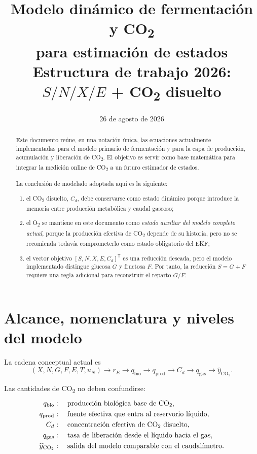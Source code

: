 \documentclass[11pt,a4paper]{article}
\title{\textbf{Modelo dinámico de fermentación y CO\textsubscript{2}\\
para estimación de estados}\\
\large Estructura de trabajo 2026: $S/N/X/E$ + CO\textsubscript{2} disuelto}
\author{}
\date{26 de agosto de 2026}
\newcommand{\COtwo}{\mathrm{CO_2}}
\begin{document}
\maketitle

\begin{abstract}
Este documento reúne, en una notación única, las ecuaciones actualmente implementadas para el
modelo primario de fermentación y para la capa de producción, acumulación y liberación de
CO\textsubscript{2}. El objetivo es servir como base matemática para integrar la medición online
de CO\textsubscript{2} a un futuro estimador de estados.

La conclusión de modelado adoptada aquí es la siguiente:
\begin{enumerate}[label=(\roman*)]
    \item el CO\textsubscript{2} disuelto, $C_d$, debe conservarse como estado dinámico porque
    introduce la memoria entre producción metabólica y caudal gaseoso;
    \item el O\textsubscript{2} se mantiene en este documento como \emph{estado auxiliar del modelo
    completo actual}, porque la producción efectiva de CO\textsubscript{2} depende de su historia,
    pero no se recomienda todavía comprometerlo como estado obligatorio del EKF;
    \item el vector objetivo $[S,N,X,E,C_d]^\mathsf{T}$ es una reducción deseada, pero el modelo
    implementado distingue glucosa $G$ y fructosa $F$. Por tanto, la reducción
    $S=G+F$ requiere una regla adicional para reconstruir el reparto $G/F$.
\end{enumerate}
\end{abstract}

\tableofcontents
\newpage

\section{Alcance, nomenclatura y niveles del modelo}

La cadena conceptual actual es
\[
(X,N,G,F,E,T,u_N)
\longrightarrow r_E
\longrightarrow q_{\mathrm{bio}}
\longrightarrow q_{\mathrm{prod}}
\longrightarrow C_d
\longrightarrow q_{\mathrm{gas}}
\longrightarrow \widehat y_{\COtwo}.
\]

Las cantidades de CO\textsubscript{2} no deben confundirse:
\begin{align*}
q_{\mathrm{bio}} &:\quad \text{producción biológica base de CO\textsubscript{2}},\\
q_{\mathrm{prod}} &:\quad \text{fuente efectiva que entra al reservorio líquido},\\
C_d &:\quad \text{concentración efectiva de CO\textsubscript{2} disuelto},\\
q_{\mathrm{gas}} &:\quad \text{tasa de liberación desde el líquido hacia el gas},\\
\widehat y_{\COtwo} &:\quad \text{salida del modelo comparable con el caudalímetro}.
\end{align*}
\end{document}
